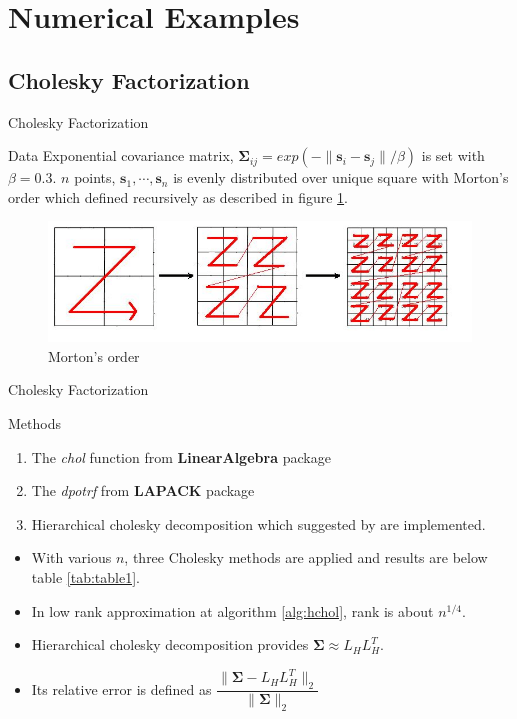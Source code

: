 \section{Numerical Examples}

\subsection{Cholesky Factorization}

\begin{frame}{Cholesky Factorization}
	
	\begin{block}{Data}
		Exponential covariance matrix, $\boldsymbol{\Sigma}_{ij}=exp(-\lVert \mathbf{s}_i-\mathbf{s}_j \rVert/\beta)$ is set with $\beta=0.3$. $n$ points, $\mathbf{s}_1,\cdots,\mathbf{s}_n$ is evenly distributed over unique square with Morton's order which defined recursively as described in figure \ref{fig:morton}.
	\end{block}

	\begin{figure}[h]
		\centering
		\includegraphics[width=.7\linewidth]{figs/Morton.jpg}
		\caption{Morton's order \citep{salem2016comparative}}
		\label{fig:morton}
	\end{figure}
\end{frame}

\begin{frame}{Cholesky Factorization}
	\begin{block}{Methods}
		\begin{enumerate}
			\item The \textit{chol} function from \textbf{LinearAlgebra} package
			\item The \textit{dpotrf} from \textbf{LAPACK} package
			\item Hierarchical cholesky decomposition which suggested by \citet{hackbusch2015hierarchical} are implemented. 
		\end{enumerate}
	\end{block}
	
	\begin{itemize}
		\item With various $n$, three Cholesky methods are applied and results are below table \ref{tab:table1}. 
		\item In low rank approximation at algorithm \ref{alg:hchol}, rank is about $n^{1/4}$.
		\item Hierarchical cholesky decomposition provides $\boldsymbol{\Sigma}\approx L_HL_H^T$. 
		\item Its relative error is defined as 
		$\dfrac{\lVert\boldsymbol{\Sigma}-L_HL_H^T\rVert_2}{\lVert\boldsymbol{\Sigma}\rVert_2}$
	\end{itemize}
	
\end{frame}


